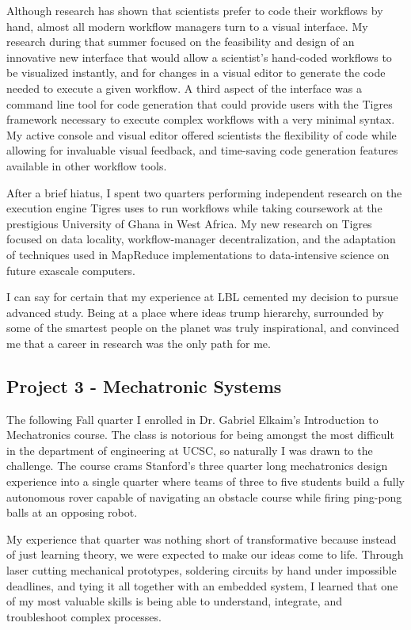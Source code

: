 \documentclass[journal]{IEEEtran}
\begin{document}
Although research has shown that scientists prefer to code their workflows by hand, almost all modern workflow managers turn to a visual interface. My research during that summer focused on the feasibility and design of an innovative new interface that would allow a scientist's hand-coded workflows to be visualized instantly, and for changes in a visual editor to generate the code needed to execute a given workflow. A third aspect of the interface was a command line tool for code generation that could provide users with the Tigres framework necessary to execute complex workflows with a very minimal syntax. My active console and visual editor offered scientists the flexibility of code while allowing for invaluable visual feedback, and time-saving code generation features available in other workflow tools. 

After a brief hiatus, I spent two quarters performing independent research on the execution engine Tigres uses to run workflows while taking coursework at the prestigious University of Ghana in West Africa. My new research on Tigres focused on data locality, workflow-manager decentralization, and the adaptation of techniques used in MapReduce implementations to data-intensive science on future exascale computers.

I can say for certain that my experience at LBL cemented my decision to pursue advanced study. Being at a place where ideas trump hierarchy, surrounded by some of the smartest people on the planet was truly inspirational, and convinced me that a career in research was the only path for me. 

\subsection{Project 3 - Mechatronic Systems}
The following Fall quarter I enrolled in Dr. Gabriel Elkaim's Introduction to Mechatronics course. The class is notorious for being amongst the most difficult in the department of engineering at UCSC, so naturally I was drawn to the challenge. The course crams Stanford's three quarter long mechatronics design experience into a single quarter where teams of three to five students build a fully autonomous rover capable of navigating an obstacle course while firing ping-pong balls at an opposing robot. 

My experience that quarter was nothing short of transformative because instead of just learning theory, we were expected to make our ideas come to life. Through laser cutting mechanical prototypes, soldering circuits by hand under impossible deadlines, and tying it all together with an embedded system, I learned that one of my most valuable skills is being able to understand, integrate, and troubleshoot complex processes. 
\end{document}
